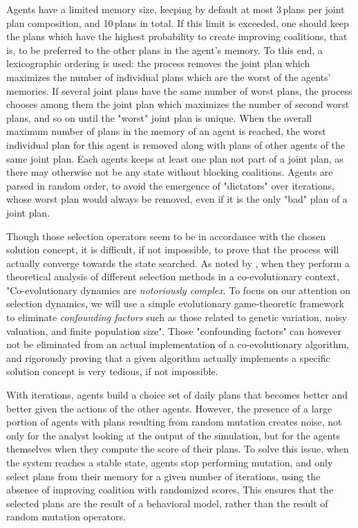 {Agents have a limited memory size, keeping by default at most 3\,plans per joint plan composition, and 10\,plans in total. If this limit is exceeded, one should keep the plans which have the highest probability to create improving coalitions, that is, to be preferred to the other plans in the agent's memory. To this end, a lexicographic ordering is used: the process removes the joint plan which maximizes the number of individual plans which are the worst of the agents' memories. If several joint plans have the same number of worst plans, the process chooses among them the joint plan which maximizes the number of second worst plans, and so on until the "worst" joint plan is unique. When the overall maximum number of plans in the memory of an agent is reached, the worst individual plan for this agent is removed along with plans of other agents of the same joint plan. Each agents keeps at least one plan not part of a joint plan, as there may otherwise not be any state without blocking coalitions. Agents are parsed in random order, to avoid the emergence of "dictators" over iterations, whose worst plan would always be removed, even if it is the only "bad" plan of a joint plan.

Though those selection operators seem to be in accordance with the chosen solution concept, it is difficult, if not impossible, to prove that the process will actually converge towards the state searched. As noted by \citet{FiciciEtAl_ITEC_2005}, when they perform a theoretical analysis of different selection methods in a co-evolutionary context, "Co-evolutionary dynamics are \emph{notoriously complex}. To focus on our attention on selection dynamics, we will use a simple evolutionary game-theoretic framework to eliminate \emph{confounding factors} such as those related to genetic variation, noisy  valuation, and finite population size". Those "confounding factors" can however not be eliminated from an actual implementation of a co-evolutionary algorithm, and rigorously proving that a given algorithm actually implements a specific solution concept is very tedious, if not impossible.

With iterations, agents build a choice set of daily plans that becomes better and better given the actions of the other agents. However, the presence of a large portion of agents with plans resulting from random mutation creates noise, not only for the analyst looking at the output of the simulation, but for the agents themselves when they compute the score of their plans. To solve this issue, when the system reaches a stable state, agents stop performing mutation, and only select plans from their memory for a given number of iterations, using the absence of improving coalition with randomized scores. This ensures that the selected plans are the result of a behavioral model, rather than the result of random mutation operators.

}
